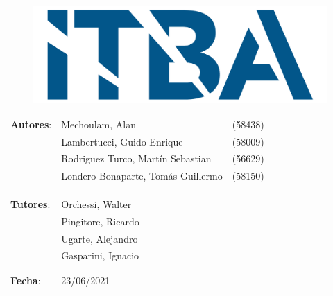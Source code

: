 \begin{titlepage}
\begin{figure}[H]
	\centering
	\includegraphics[width=0.5\linewidth]{./Utils/ITBA_2}
\end{figure}

\vspace*{1.5cm}

\center
{  }

\vspace*{1cm}

{ \textcolor{PName}{} }

\vspace*{3cm}

\begin{tabular}{llr} 	
\textbf{Autores}: & Mechoulam, Alan  &  (58438)\\
 & Lambertucci, Guido Enrique  & (58009) \\
 & Rodriguez Turco, Martín Sebastian  & (56629) \\
 & Londero Bonaparte, Tomás Guillermo  & (58150) \\
 &  & \\
 &  & \\
 &  & \\
\textbf{Tutores}: & Orchessi, Walter & \hspace*{4cm} \\
 & Pingitore, Ricardo & \hspace*{4cm} \\
 & Ugarte, Alejandro & \hspace*{4cm} \\
 & Gasparini, Ignacio & \hspace*{4cm} \\
 &  & \\
 &  & \\
\textbf{Fecha}: & 23/06/2021 & \hspace*{4.5cm}\\
\end{tabular}

\end{titlepage}